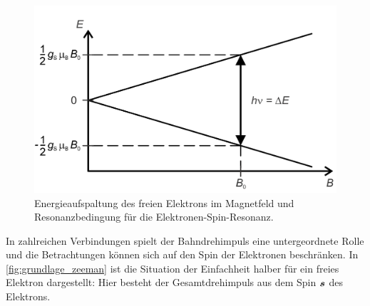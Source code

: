 \documentclass[ngerman]{scrartcl}
\begin{document}
\begin{figure}[H]
    \centering
    \begin{samepage}
        \includegraphics[width=0.65\linewidth]{fig/zeeman_grundlage.png}
        \caption[Zeeman-Effekt]{Energieaufspaltung des freien Elektrons im Magnetfeld
            und Resonanzbedingung für die Elektronen-Spin-Resonanz.}
        \label{fig:grundlage_zeeman}
    \end{samepage}
\end{figure}
%
In zahlreichen Verbindungen spielt der Bahndrehimpuls eine untergeordnete Rolle und die Betrachtungen können sich auf den Spin der Elektronen beschränken. In \autoref{fig:grundlage_zeeman} ist die Situation der Einfachheit halber für ein freies Elektron dargestellt: Hier besteht der Gesamtdrehimpuls aus dem Spin $\vb*{s}$ des Elektrons.
\end{document}
